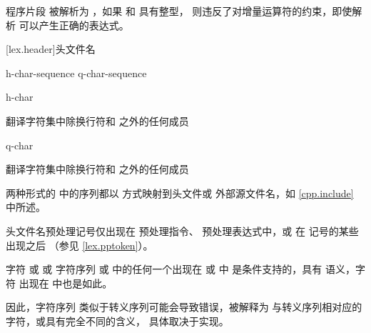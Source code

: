 \pnum
\begin{example}
程序片段  被解析为 ，如果  和  具有整型，
则违反了对增量运算符的约束，即使解析
 可以产生正确的表达式。
\end{example}

[lex.header]{头文件名}

%
\begin{bnf}
\obeyspaces
{}\br
    \terminal{<} h-char-sequence \terminal{>}\br
     q-char-sequence 
\end{bnf}

\begin{bnf}
\br
    h-char 
\end{bnf}

\begin{bnf}
\br
    \textnormal{翻译字符集中除换行符和 } 之外的任何成员
\end{bnf}

\begin{bnf}
\br
    q-char 
\end{bnf}

\begin{bnf}
\br
    \textnormal{翻译字符集中除换行符和 } 之外的任何成员
\end{bnf}

\pnum
两种形式的  中的序列都以
 方式映射到头文件或
外部源文件名，如 \ref{cpp.include} 中所述。
\begin{note}
头文件名预处理记号仅出现在
 预处理指令、
 预处理表达式中，或
在  记号的某些出现之后
（参见 \ref{lex.pptoken}）。
\end{note}

\pnum
字符  或 \tcode{\textbackslash} 或
字符序列 \tcode{/*} 或 \tcode{//} 中的任何一个出现在
 或  中
是条件支持的，具有  语义，字符
 出现在  中也是如此。
\begin{note}
因此，字符序列
类似于转义序列可能会导致错误，被解释为
与转义序列相对应的字符，或具有完全不同的含义，
具体取决于实现。
\end{note}

